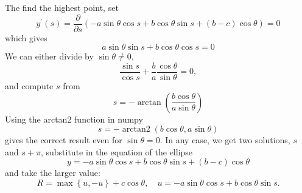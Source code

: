\documentclass{article}
\begin{document}
The find the highest point, set
$$
y^{\prime}\left(  s\right)  =\frac{\partial}{\partial s}\left(  -a\sin
\theta\cos s+b\cos\theta\sin s+(b-c)\cos\theta\right)  =0
$$
which gives
$$
a\sin\theta\sin s+b\cos\theta\cos s=0
$$
We can either divide by $\sin\theta\neq0$,
$$
\frac{\sin s}{\cos s}+\frac{b}{a}\frac{\cos\theta}{\sin\theta}=0,
$$
and compute $s$ from
$$
s=-\arctan\left(  \frac{b\cos\theta}{a\sin\theta}\right)
$$
Using the arctan2 function in numpy
$$
s=-\mathop{arctan2}\left(  b\cos\theta,a\sin\theta\right)
$$
gives the correct result even for $\sin\theta=0.$ In any case, we get two solutions, $s$
and $s+\pi$,  substitute in the equation of the ellipse
$$
y=-a\sin\theta\cos s+b\cos\theta\sin s+\left(  b-c\right)  \cos\theta
$$
and take the larger value:
$$
R=\max\left\{  u,-u\right\}  +c\cos\theta,\quad u=-a\sin\theta\cos
s+b\cos\theta\sin s.
$$


\nocite{Mandel-2009-DAW}

\end{document}
